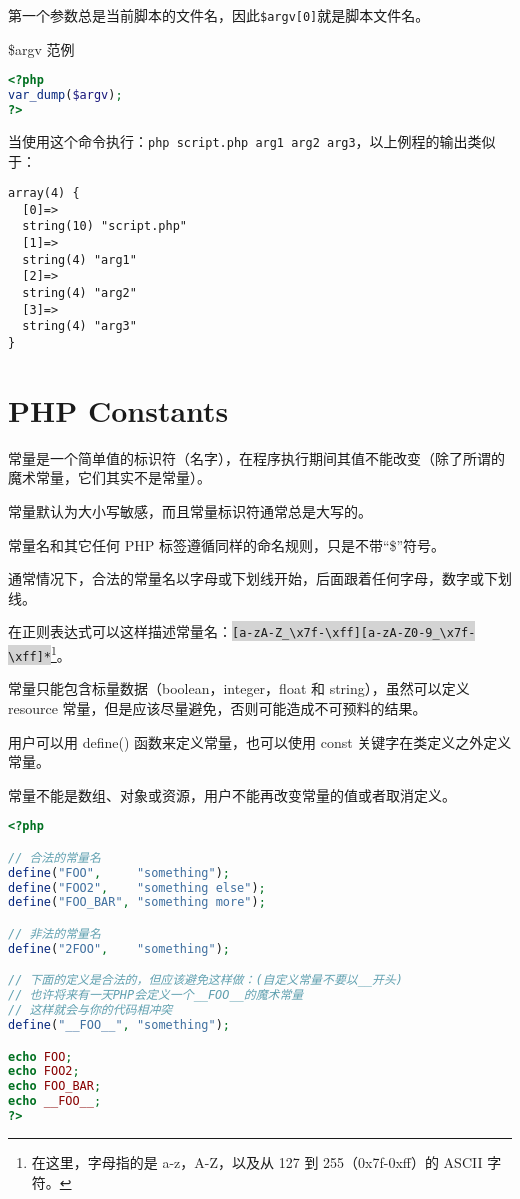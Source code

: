 第一个参数总是当前脚本的文件名，因此\texttt{\$argv[0]}就是脚本文件名。


\begin{example}
\$argv 范例
\begin{lstlisting}[language=PHP]
<?php
var_dump($argv);
?>
\end{lstlisting}
\end{example}

当使用这个命令执行：\verb|php script.php arg1 arg2 arg3|，以上例程的输出类似于：

\begin{verbatim}
array(4) {
  [0]=>
  string(10) "script.php"
  [1]=>
  string(4) "arg1"
  [2]=>
  string(4) "arg2"
  [3]=>
  string(4) "arg3"
}
\end{verbatim}


\chapter{PHP Constants}

常量是一个简单值的标识符（名字），在程序执行期间其值不能改变（除了所谓的魔术常量，它们其实不是常量）。

\begin{compactitem}
\item 常量默认为大小写敏感，而且常量标识符通常总是大写的。
\item 常量名和其它任何 PHP 标签遵循同样的命名规则，只是不带“\$”符号。
\end{compactitem}

通常情况下，合法的常量名以字母或下划线开始，后面跟着任何字母，数字或下划线。

在正则表达式可以这样描述常量名：\colorbox{lightgray}{\texttt{[a-zA-Z\_\textbackslash x7f-\textbackslash xff][a-zA-Z0-9\_\textbackslash x7f-\textbackslash xff]*}}\footnote{在这里，字母指的是 a-z，A-Z，以及从 127 到 255（0x7f-0xff）的 ASCII 字符。}。

常量只能包含标量数据（boolean，integer，float 和 string），虽然可以定义 resource 常量，但是应该尽量避免，否则可能造成不可预料的结果。



用户可以用 define() 函数来定义常量，也可以使用 const 关键字在类定义之外定义常量。

常量不能是数组、对象或资源，用户不能再改变常量的值或者取消定义。

\begin{lstlisting}[language=PHP]
<?php

// 合法的常量名
define("FOO",     "something");
define("FOO2",    "something else");
define("FOO_BAR", "something more");

// 非法的常量名
define("2FOO",    "something");

// 下面的定义是合法的，但应该避免这样做：(自定义常量不要以__开头)
// 也许将来有一天PHP会定义一个__FOO__的魔术常量
// 这样就会与你的代码相冲突
define("__FOO__", "something");

echo FOO;
echo FOO2;
echo FOO_BAR;
echo __FOO__;
?>
\end{lstlisting}


